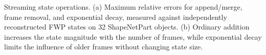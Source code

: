 \caption{Streaming state operations. (a) Maximum relative errors for append/merge, frame removal, and exponential decay, measured against independently reconstructed FWP states on 32 ShapeNetPart objects. (b) Ordinary addition increases the state magnitude with the number of frames, while exponential decay limits the influence of older frames without changing state size.}
\label{fig:streaming-state-operations}
